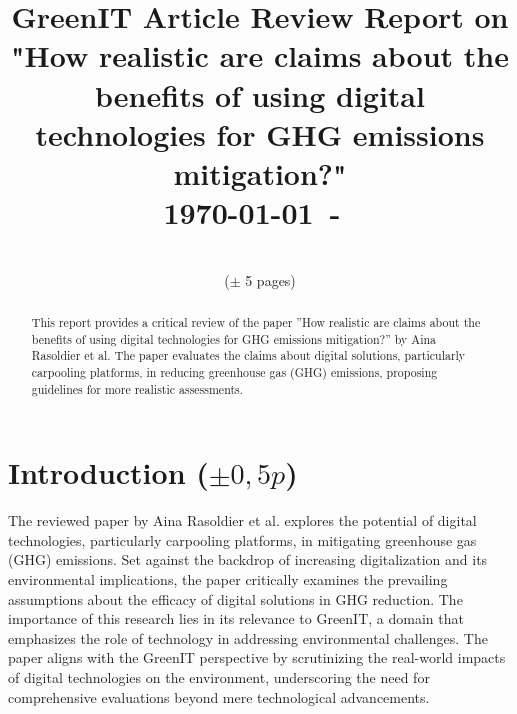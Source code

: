 \documentclass[conference,compsoc]{IEEEtran}
\begin{document}
\title{GreenIT Article Review Report on\\
"How realistic are claims about the benefits of using digital technologies for GHG emissions mitigation?"
\\

{\small \today~-~\currenttime}}
 
\author{
\\
($\pm$ 5 pages)\\}

\maketitle

\begin{abstract}

This report provides a critical review of the paper ”How realistic are claims about the benefits of using digital technologies for GHG emissions mitigation?” by Aina Rasoldier et al. The paper evaluates the claims about digital solutions, particularly carpooling platforms, in reducing greenhouse gas (GHG) emissions, proposing guidelines for more realistic assessments.

\end{abstract}

\section{Introduction ($\pm 0,5p$)}

The reviewed paper by Aina Rasoldier et al. explores
the potential of digital technologies, particularly carpooling
platforms, in mitigating greenhouse gas (GHG) emissions.
Set against the backdrop of increasing digitalization and its
environmental implications, the paper critically examines the
prevailing assumptions about the efficacy of digital solutions
in GHG reduction. The importance of this research lies in
its relevance to GreenIT, a domain that emphasizes the role
of technology in addressing environmental challenges. The
paper aligns with the GreenIT perspective by scrutinizing the
real-world impacts of digital technologies on the environment,
underscoring the need for comprehensive evaluations beyond
mere technological advancements.
\end{document}
